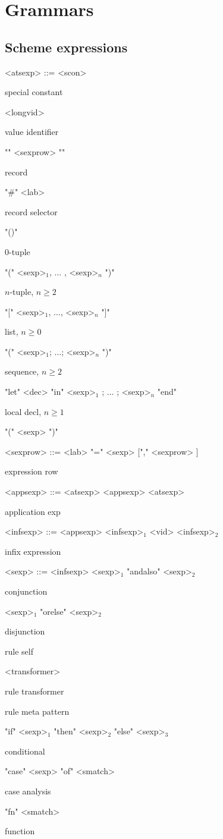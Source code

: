 \chapter{Grammars}

\section{Scheme expressions}

\begin{nonfloatingtable}

\setlength{\grammarindent}{7em}


\renewcommand{\cmt}[1]{\parbox{8em}{\small{#1}}}

\begin{grammar}
 
  <atsexp> ::= <scon>                                            \hfill \cmt{special constant}
  \alt ["op"] <longvid>                                          \hfill \cmt{value identifier}
  \alt "{" <sexprow> "}"                                         \hfill \cmt{record}
  \alt "\#" <lab>                                                \hfill \cmt{record selector}
  \alt "()"                                                      \hfill \cmt{$0$-tuple}
  \alt "(" <sexp>$_1$, $\ldots$ , <sexp>$_n$ ")"                 \hfill \cmt{$n$-tuple, $n \geq 2$}
  \alt "[" <sexp>$_1$, $\ldots$, <sexp>$_n$ "]"                  \hfill \cmt{list, $n \geq 0$}
  \alt "(" <sexp>$_1$; $\ldots$; <sexp>$_n$ ")"                  \hfill \cmt{sequence, $n \geq 2$}  
  \alt "let" <dec> "in" <sexp>$_1$ ; $\ldots$ ; <sexp>$_n$ "end" \hfill \cmt{local decl, $n \geq 1$}
  \alt "(" <sexp> ")"
  
  <sexprow> ::= <lab> "=" <sexp> ["," <sexprow> ]          \hfill \cmt{expression row}

  <appsexp> ::= <atsexp>
  \alt <appsexp> <atsexp>                                  \hfill \cmt{application exp}

  <infsexp> ::= <appsexp>
  \alt <infsexp>$_1$ <vid> <infsexp>$_2$                   \hfill \cmt{infix expression}
  
  <sexp> ::= <infsexp>
  \alt <sexp>$_1$ "andalso" <sexp>$_2$                     \hfill \cmt{conjunction}
  \alt <sexp>$_1$ "orelse"  <sexp>$_2$                     \hfill \cmt{disjunction}
                                           \hfill \cmt{rule self}
  \alt <transformer>                                       \hfill \cmt{rule transformer}
                                   \hfill \cmt{rule meta pattern}
  \alt "if" <sexp>$_1$ "then" <sexp>$_2$ "else" <sexp>$_3$ \hfill \cmt{conditional}
  \alt "case" <sexp> "of" <smatch>                         \hfill \cmt{case analysis}
  \alt "fn" <smatch>                                       \hfill \cmt{function}
  

\end{grammar}
\end{nonfloatingtable}
